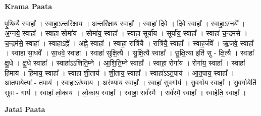 \documentclass[17pt]{extarticle}
\begin{document}
\textbf{Krama Paata} \newline

पृ॒थि॒व्यै स्वाहा᳚ । स्वाहा॒ऽन्तरि॑क्षाय । अ॒न्तरि॑क्षाय॒ स्वाहा᳚ । स्वाहा॑ दि॒वे । दि॒वे स्वाहा᳚ । स्वाहा॒ऽग्नये᳚ । अ॒ग्नये॒ स्वाहा᳚ । स्वाहा॒ सोमा॑य । सोमा॑य॒ स्वाहा᳚ । स्वाहा॒ सूर्या॑य । सूर्या॑य॒ स्वाहा᳚ । स्वाहा॑ च॒न्द्रम॑से । च॒न्द्रम॑से॒ स्वाहा᳚ । स्वाहाऽह्ने᳚ । अह्ने॒ स्वाहा᳚ । स्वाहा॒ रात्रि॑यै । रात्रि॑यै॒ स्वाहा᳚ । स्वाह॒र्जवे᳚ । ऋ॒जवे॒ स्वाहा᳚ । स्वाहा॑ सा॒धवे᳚ । सा॒धवे॒ स्वाहा᳚ । स्वाहा॑ सुक्षि॒त्यै । सु॒क्षि॒त्यै स्वाहा᳚ । सु॒क्षि॒त्या इति॑ सु - क्षि॒त्यै । स्वाहा᳚ क्षु॒धे । क्षु॒धे स्वाहा᳚ । स्वाहा॑ऽऽशिति॒म्ने । आ॒शि॒ति॒म्ने स्वाहा᳚ । स्वाहा॒ रोगा॑य । रोगा॑य॒ स्वाहा᳚ । स्वाहा॑ हि॒माय॑ । हि॒माय॒ स्वाहा᳚ । स्वाहा॑ शी॒ताय॑ । शी॒ताय॒ स्वाहा᳚ । स्वाहा॑ऽऽत॒पाय॑ । आ॒त॒पाय॒ स्वाहा᳚ । आ॒त॒पायेत्या᳚ - त॒पाय॑ । स्वाहाऽर॑ण्याय । अर॑ण्याय॒ स्वाहा᳚ । स्वाहा॑ सुव॒र्गाय॑ । सु॒व॒र्गाय॒ स्वाहा᳚ । सु॒व॒र्गायेति॑ सुवः - गाय॑ । स्वाहा॑ लो॒काय॑ । लो॒काय॒ स्वाहा᳚ । स्वाहा॒ सर्व॑स्मै । सर्व॑स्मै॒ स्वाहा᳚ । स्वाहेति॒ स्वाहा᳚ । \newline

\textbf{Jatai Paata} \newline
\end{document}
